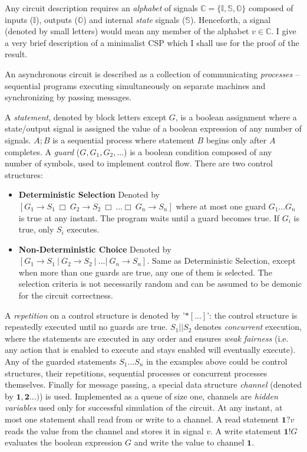 Any circuit description requires an \emph{alphabet} of signals 
$\mathbb{C} = \{\mathbb{I}, \mathbb{S}, \mathbb{O}\}$ composed of  
inputs ($\mathbb{I}$), outputs ($\mathbb{O}$) and internal \emph{state}
signals ($\mathbb{S}$). Henceforth, a signal (denoted by small letters)
would mean any member of the alphabet $v \in \mathbb{C}$. 
I give a very brief description of a minimalist CSP
which I shall use for the proof of the result.

An asynchronous circuit is described as a collection of communicating \emph{processes} --
sequential programs executing simultaneously on separate machines and 
synchronizing by passing messages. 

A \emph{statement}, denoted by block letters except $G$, is a boolean assignment
where a state/output signal is assigned the value of a boolean expression 
of any number of signals. $A; B$ is a sequential process 
where statement $B$ begins only after $A$ completes. 
A \emph{guard} ($G, G_1, G_2, ...$) is a boolean condition composed of any number of
symbols, used to implement control flow. There are two control structures:
\begin{itemize}
	\item \textbf{Deterministic Selection} Denoted by 
		$[ G_1 \to S_1\ \Box\ G_2 \to S_2\ \Box\ ... \Box\ G_n \to S_n ]$  
		where at most one guard $G_1 ... G_n$ is true at any instant. 
		The program waits until a guard becomes true. 
		If $G_i$ is true, only $S_i$ executes.

	\item \textbf{Non-Deterministic Choice} Denoted by 
		$[ G_1 \to S_1\ |\ G_2 \to S_2\ |\ ... |\ G_n \to S_n ]$.
		Same as Deterministic Selection, except when more than one
		guards are true, any one of them is selected. The selection criteria
		is not necessarily random and can be assumed to be demonic for the
		circuit correctness.
\end{itemize}
A \emph{repetition} on a control structure is denoted by '$*[...]$': 
the control structure is repeatedly executed until no guards are true.
$S_1 || S_2$ denotes \emph{concurrent} execution, where the statements are executed
in any order and ensures \emph{weak fairness} (i.e. any action that is enabled
to execute and stays enabled will eventually execute).
Any of the guarded statements $S_1... S_n$ in the examples above could be 
control structures, their repetitions, sequential processes or concurrent processes themselves. 
Finally for message passing, a special data structure \emph{channel} (denoted
by $\mathbf{1}, \mathbf{2}...)$) is used. 
Implemented as a queue of size one, channels are
\emph{hidden variables} used only for successful simulation of the circuit. 
At any instant, at most one statement shall read from or write to a channel.
A read statement $\mathbf{1} ? v$ reads the value from the channel and stores
it in signal $v$. A write statement $\mathbf{1} ! G$ evaluates the boolean
expression $G$ and write the value to channel $\mathbf{1}$. 
\\

